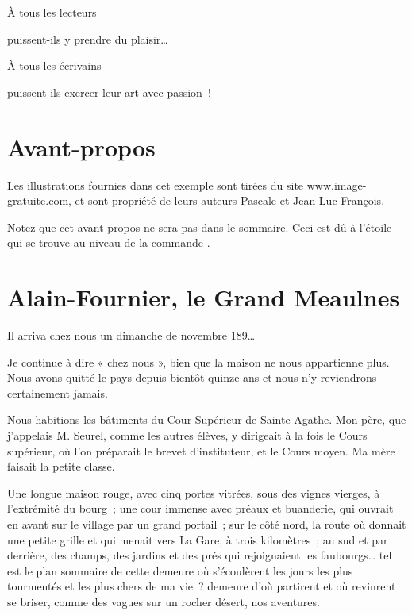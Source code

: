 \documentclass[petitlivre,chapnumsimple]{publivre}
\begin{document}
\begin{dedicace}
À tous les lecteurs

puissent-ils y prendre du plaisir…

À tous les écrivains

puissent-ils exercer leur art avec passion !
\end{dedicace}

\chapter*{Avant-propos}

Les illustrations fournies dans cet exemple sont tirées du site www.image-gratuite.com, et sont propriété de leurs auteurs Pascale et Jean-Luc François.

Notez que cet avant-propos ne sera pas dans le sommaire. Ceci est dû à l'étoile qui se trouve au niveau de la commande .

\chapter{Alain-Fournier, le Grand Meaulnes}

Il arriva chez nous un dimanche de novembre 189…

Je continue à dire « chez nous », bien que la maison ne nous appartienne plus. Nous avons quitté le pays depuis bientôt quinze ans et nous n'y reviendrons certainement jamais.

Nous habitions les bâtiments du Cour Supérieur de Sainte-Agathe. Mon père, que j'appelais M. Seurel, comme les autres élèves, y dirigeait à la fois le Cours supérieur, où l'on préparait le brevet d'instituteur, et le Cours moyen. Ma mère faisait la petite classe.

Une longue maison rouge, avec cinq portes vitrées, sous des vignes vierges, à l'extrémité du bourg ; une cour immense avec préaux et buanderie, qui ouvrait en avant sur le village par un grand portail ; sur le côté nord, la route où donnait une petite grille et qui menait vers La Gare, à trois kilomètres ; au sud et par derrière, des champs, des jardins et des prés qui rejoignaient les faubourgs… tel est le plan sommaire de cette demeure où s'écoulèrent les jours les plus tourmentés et les plus chers de ma vie ? demeure d'où partirent et où revinrent se briser, comme des vagues sur un rocher désert, nos aventures.
\end{document}
